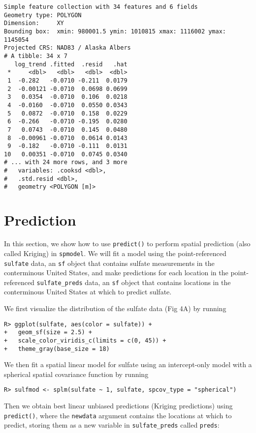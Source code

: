 \documentclass[10pt,letterpaper]{article}
\begin{document}
\begin{verbatim}
Simple feature collection with 34 features and 6 fields
Geometry type: POLYGON
Dimension:     XY
Bounding box:  xmin: 980001.5 ymin: 1010815 xmax: 1116002 ymax: 1145054
Projected CRS: NAD83 / Alaska Albers
# A tibble: 34 x 7
   log_trend .fitted  .resid   .hat
 *     <dbl>   <dbl>   <dbl>  <dbl>
 1  -0.282   -0.0710 -0.211  0.0179
 2  -0.00121 -0.0710  0.0698 0.0699
 3   0.0354  -0.0710  0.106  0.0218
 4  -0.0160  -0.0710  0.0550 0.0343
 5   0.0872  -0.0710  0.158  0.0229
 6  -0.266   -0.0710 -0.195  0.0280
 7   0.0743  -0.0710  0.145  0.0480
 8  -0.00961 -0.0710  0.0614 0.0143
 9  -0.182   -0.0710 -0.111  0.0131
10   0.00351 -0.0710  0.0745 0.0340
# ... with 24 more rows, and 3 more
#   variables: .cooksd <dbl>,
#   .std.resid <dbl>,
#   geometry <POLYGON [m]>
\end{verbatim}

\hypertarget{sec:prediction}{%
\section{Prediction}\label{sec:prediction}}

In this section, we show how to use \texttt{predict()} to perform
spatial prediction (also called Kriging) in \texttt{spmodel}. We will
fit a model using the point-referenced \texttt{sulfate} data, an
\texttt{sf} object that contains sulfate measurements in the
conterminous United States, and make predictions for each location in
the point-referenced \texttt{sulfate\_preds} data, an \texttt{sf} object
that contains locations in the conterminous United States at which to
predict sulfate.

We first visualize the distribution of the sulfate data (Fig 4A) by
running

\begin{verbatim}
R> ggplot(sulfate, aes(color = sulfate)) +
+   geom_sf(size = 2.5) +
+   scale_color_viridis_c(limits = c(0, 45)) +
+   theme_gray(base_size = 18)
\end{verbatim}

We then fit a spatial linear model for sulfate using an intercept-only
model with a spherical spatial covariance function by running

\begin{verbatim}
R> sulfmod <- splm(sulfate ~ 1, sulfate, spcov_type = "spherical")
\end{verbatim}

Then we obtain best linear unbiased predictions (Kriging predictions)
using \texttt{predict()}, where the \texttt{newdata} argument contains
the locations at which to predict, storing them as a new variable in
\texttt{sulfate\_preds} called \texttt{preds}:
\end{document}
